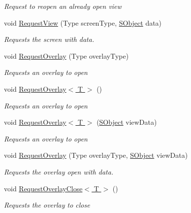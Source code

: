 \begin{DoxyCompactItemize}
\begin{DoxyCompactList}\small\item\em Request to reopen an already open view \end{DoxyCompactList}\item 
void \hyperlink{class_scaffolding_1_1_view_manager_base_a194a6730d30f15d9cd2bc0809ecbdea7}{Request\+View} (Type screen\+Type, \hyperlink{class_scaffolding_1_1_s_object}{S\+Object} data)
\begin{DoxyCompactList}\small\item\em Requests the screen with data. \end{DoxyCompactList}\item 
void \hyperlink{class_scaffolding_1_1_view_manager_base_a38479b74a1e0cdcfa81f967c753062fb}{Request\+Overlay} (Type overlay\+Type)
\begin{DoxyCompactList}\small\item\em Requests an overlay to open \end{DoxyCompactList}\item 
void \hyperlink{class_scaffolding_1_1_view_manager_base_a8e99066d44cc24df5a78ce9cfa5f792c}{Request\+Overlay$<$ T $>$} ()
\begin{DoxyCompactList}\small\item\em Requests an overlay to open \end{DoxyCompactList}\item 
void \hyperlink{class_scaffolding_1_1_view_manager_base_a8e0638cb6ce962d9f6b4accf70399eca}{Request\+Overlay$<$ T $>$} (\hyperlink{class_scaffolding_1_1_s_object}{S\+Object} view\+Data)
\begin{DoxyCompactList}\small\item\em Requests an overlay to open \end{DoxyCompactList}\item 
void \hyperlink{class_scaffolding_1_1_view_manager_base_ac22aa52e9532ff847d464a251082dce3}{Request\+Overlay} (Type overlay\+Type, \hyperlink{class_scaffolding_1_1_s_object}{S\+Object} view\+Data)
\begin{DoxyCompactList}\small\item\em Requests the overlay open with data. \end{DoxyCompactList}\item 
void \hyperlink{class_scaffolding_1_1_view_manager_base_afe33255e871d0c4228c7629911e97df2}{Request\+Overlay\+Close$<$ T $>$} ()
\begin{DoxyCompactList}\small\item\em Requests the overlay to close \end{DoxyCompactList}\item 

\end{DoxyCompactItemize}

